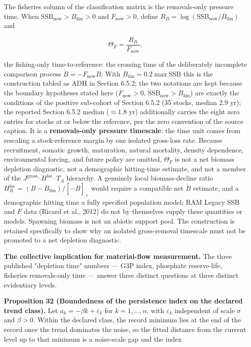 \documentclass[11pt]{article}
\begin{document}
The fisheries column of the classification matrix is the removals-only pressure time. When \(\mathrm{SSB}_{\mathrm{now}} > B_{\lim} > 0\) and \(F_{\mathrm{now}} > 0\), define \(R_B =\allowbreak{} \log(\mathrm{SSB}_{\mathrm{now}}/B_{\lim})\) and 

$$\Theta_F = \frac{R_B}{F_{\mathrm{now}}},$$

 the fishing-only time-to-reference: the crossing time of the deliberately incomplete comparison process \(\dot B = -F_{\mathrm{now}}B\). With \(B_{\lim} =\allowbreak{} 0.2 \max \mathrm{SSB}\) this is the construction tabled as ADH in Section 6.5.2; the two notations are kept because the boundary hypotheses stated here (\(F_{\mathrm{now}} > 0\), \(\mathrm{SSB}_{\mathrm{now}} > B_{\lim}\)) are exactly the conditions of the positive sub-cohort of Section 6.5.2 (35 stocks, median \(2.9\) yr); the reported Section 6.5.2 median (\(\approx 1.8\) yr) additionally carries the eight zero entries for stocks at or below the reference, per the zero convention of the source caption. It is a \textbf{removals-only pressure timescale}: the time unit comes from rescaling a stock-reference margin by one isolated gross-loss rate. Because recruitment, somatic growth, maturation, natural mortality, density dependence, environmental forcing, and future policy are omitted, \(\Theta_F\) is not a net biomass depletion diagnostic, not a demographic hitting-time estimate, and not a member of the \(J^{\mathrm{gross}}\)--\(H^{\mathrm{loc}}\)--\(T_A\) hierarchy. A genuinely local biomass-decline ratio \(H_B^{\mathrm{loc}} =\allowbreak{} (B - B_{\lim})/[-\dot B]_+\allowbreak{}\) would require a compatible net \(\dot B\) estimate, and a demographic hitting time a fully specified population model; RAM Legacy SSB and \(F\) data (Ricard et al., 2012) do not by themselves supply these quantities or models. Spawning biomass is not an abiotic support pool. The construction is retained specifically to show why an isolated gross-removal timescale must not be promoted to a net depletion diagnostic.

\textbf{The collective implication for material-flow measurement.} The three published "depletion time" numbers --- G3P index, phosphate reserve-life, fisheries removals-only time --- answer three distinct questions at three distinct evidentiary levels.

\textbf{Proposition 32 (Boundedness of the persistence index on the declared trend class).} Let \(a_k=-\beta k+\varepsilon_k\) for \(k=1,\dots,n\), with \(\varepsilon_k\) independent of scale \(\sigma\) and \(\beta>0\). Within the declared class, the record minimum lies at the end of the record once the trend dominates the noise, so the fitted distance from the current level up to that minimum is a noise-scale gap and the index 
\end{document}
